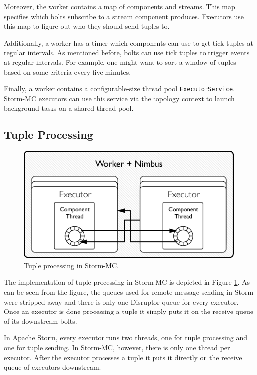 Moreover, the worker contains a map of components and streams. This map specifies which bolts subscribe to a stream component produces. Executors use this map to figure out who they should send tuples to.

Additionally, a worker has a timer which components can use to get tick tuples at regular intervals. As mentioned before, bolts can use tick tuples to trigger events at regular intervals. For example, one might want to sort a window of tuples based on some criteria every five minutes.

Finally, a worker contains a configurable-size thread pool \texttt{ExecutorService}. Storm-MC executors can use this service via the topology context to launch background tasks on a shared thread pool.

\subsection{Tuple Processing}

\begin{figure}[!htb]
	\centering
	\includegraphics[scale=0.7]{pdf/worker_inside_mc.pdf}
	\caption{Tuple processing in Storm-MC.}
	\label{fig:worker_inside_mc}
\end{figure}

The implementation of tuple processing in Storm-MC is depicted in Figure \ref{fig:worker_inside_mc}. As can be seen from the figure, the queues used for remote message sending in Storm were stripped away and there is only one Disruptor queue for every executor. Once an executor is done processing a tuple it simply puts it on the receive queue of its downstream bolts.

In Apache Storm, every executor runs two threads, one for tuple processing and one for tuple sending. In Storm-MC, however, there is only one thread per executor. After the executor processes a tuple it puts it directly on the receive queue of executors downstream.

